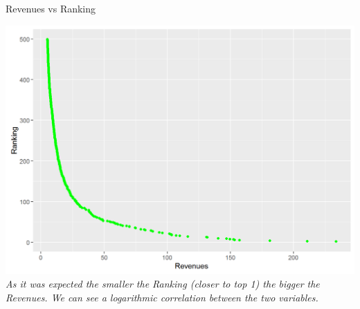 \documentclass{book}
\begin{document}
\begin{table}[H]
\centering
\caption{Revenues vs Ranking}
\begin{center}
\includegraphics[scale=0.4]{../R/photos/08_rank_rev.png}  \\
\textit{As it was expected the smaller the Ranking (closer to top 1) the bigger the Revenues. We can see a logarithmic correlation between the two variables.}
\end{center}
\end{table}
\end{document}
